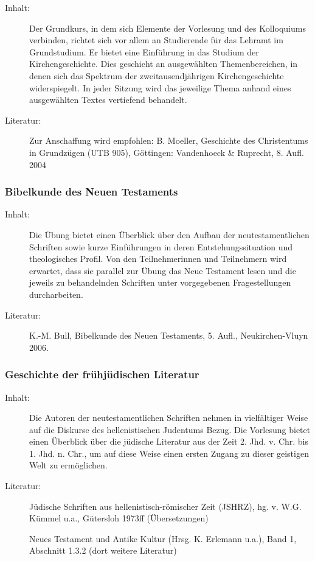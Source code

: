\documentclass[%
a4paper, %
11pt,               %
leqno,              %
fleqn,              %
]
{scrartcl}
\begin{document}
\begin{description}
  \item[Inhalt:] Der Grundkurs, in dem sich Elemente der Vorlesung und des
    Kolloquiums verbinden, richtet sich vor allem an Studierende für das Lehramt
    im Grundstudium. Er bietet eine Einführung in das Studium der
    Kirchengeschichte. Dies geschieht an ausgewählten Themenbereichen, in denen
    sich das Spektrum der zweitausendjährigen Kirchengeschichte widerspiegelt.
    In jeder Sitzung wird das jeweilige Thema anhand eines ausgewählten Textes
    vertiefend behandelt.
  \item[Literatur:] Zur Anschaffung wird empfohlen: B. Moeller, Geschichte des
    Christentums in Grundzügen (UTB 905), Göttingen: Vandenhoeck \& Ruprecht, 8.
    Aufl. 2004
\end{description}


\subsubsection{Bibelkunde des Neuen Testaments} %
\label{ssub:Bibelkunde des Neuen Testaments}

\begin{description}
  \item[Inhalt:] Die Übung bietet einen Überblick über den Aufbau der
    neutestamentlichen Schriften sowie kurze Einführungen in deren
    Entstehungssituation und theologisches Profil. Von den Teilnehmerinnen und
    Teilnehmern wird erwartet, dass sie parallel zur Übung das Neue Testament
    lesen und die jeweils zu behandelnden Schriften unter vorgegebenen
    Fragestellungen durcharbeiten.
  \item[Literatur:] K.-M. Bull, Bibelkunde des Neuen Testaments, 5. Aufl.,
    Neukirchen-Vluyn 2006.
\end{description}


\subsubsection{Geschichte der frühjüdischen Literatur} %
\label{ssub:Geschichte der frühjüdischen Literatur}

\begin{description}
  \item[Inhalt:] Die Autoren der neutestamentlichen Schriften nehmen in
    vielfältiger Weise auf die Diskurse des hellenistischen Judentums Bezug. Die
    Vorlesung bietet einen Überblick über die jüdische Literatur aus der Zeit 2.
    Jhd. v. Chr. bis 1. Jhd. n. Chr., um auf diese Weise einen ersten Zugang zu
    dieser geistigen Welt zu ermöglichen.
  \item[Literatur:] Jüdische Schriften aus hellenistisch-römischer Zeit (JSHRZ),
    hg. v. W.G. Kümmel u.a., Gütersloh 1973ff (Übersetzungen)

    Neues Testament und Antike Kultur (Hrsg. K. Erlemann u.a.), Band 1,
    Abschnitt 1.3.2 (dort weitere Literatur)
\end{description}
\end{document}
